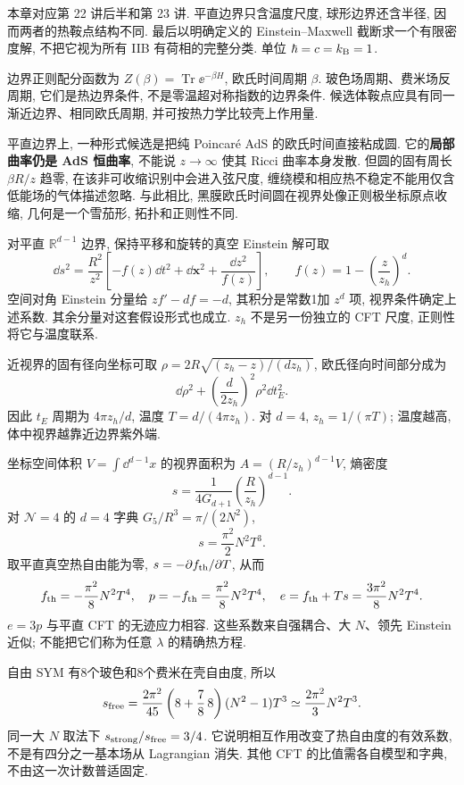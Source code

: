 本章对应第 22 讲后半和第 23 讲. 平直边界只含温度尺度, 球形边界还含半径, 因而两者的热鞍点结构不同. 最后以明确定义的 Einstein--Maxwell 截断求一个有限密度解, 不把它视为所有 IIB 有荷相的完整分类. 单位 $\hbar=c=k_{\mathrm B}=1$.

边界正则配分函数为 $Z(\beta)=\operatorname{Tr}\ee^{-\beta H}$, 欧氏时间周期 $\beta$. 玻色场周期、费米场反周期, 它们是热边界条件, 不是零温超对称指数的边界条件. 候选体鞍点应具有同一渐近边界、相同欧氏周期, 并可按热力学比较壳上作用量.

平直边界上, 一种形式候选是把纯 Poincaré AdS 的欧氏时间直接粘成圆. 它的\textbf{局部曲率仍是 AdS 恒曲率}, 不能说 $z\to\infty$ 使其 Ricci 曲率本身发散. 但圆的固有周长 $\beta R/z$ 趋零, 在该非可收缩识别中会进入弦尺度, 缠绕模和相应热不稳定不能用仅含低能场的气体描述忽略. 与此相比, 黑膜欧氏时间圆在视界处像正则极坐标原点收缩, 几何是一个雪茄形, 拓扑和正则性不同.

对平直 $\mathbb R^{d-1}$ 边界, 保持平移和旋转的真空 Einstein 解可取
\[
\dd s^2=\frac{R^2}{z^2}
\left[-f(z)\dd t^2+\dd\mathbf x^2+\frac{\dd z^2}{f(z)}\right],
\qquad f(z)=1-\left(\frac z{z_h}\right)^d.
\]
空间对角 Einstein 分量给 $zf'-df=-d$, 其积分是常数1加 $z^d$ 项, 视界条件确定上述系数. 其余分量对这套假设形式也成立. $z_h$ 不是另一份独立的 CFT 尺度, 正则性将它与温度联系.

近视界的固有径向坐标可取 $\rho=2R\sqrt{(z_h-z)/(dz_h)}$, 欧氏径向时间部分成为
\[
\dd\rho^2+\left(\frac d{2z_h}\right)^2\rho^2\dd t_E^2.
\]
因此 $t_E$ 周期为 $4\pi z_h/d$, 温度 $T=d/(4\pi z_h)$. 对 $d=4$, $z_h=1/(\pi T)$; 温度越高, 体中视界越靠近边界紫外端.

坐标空间体积 $V=\int\dd^{d-1}x$ 的视界面积为 $A=(R/z_h)^{d-1}V$, 熵密度
\[
s=\frac1{4G_{d+1}}\left(\frac R{z_h}\right)^{d-1}.
\]
对 $\mathcal N=4$ 的 $d=4$ 字典 $G_5/R^3=\pi/(2N^2)$,
\[
s=\frac{\pi^2}2N^2T^3.
\]
取平直真空热自由能为零, $s=-\partial f_{\rm th}/\partial T$, 从而
\[
f_{\rm th}=-\frac{\pi^2}8N^2T^4,
\quad p=-f_{\rm th}=\frac{\pi^2}8N^2T^4,
\quad e=f_{\rm th}+Ts=\frac{3\pi^2}8N^2T^4.
\]
$e=3p$ 与平直 CFT 的无迹应力相容. 这些系数来自强耦合、大 $N$、领先 Einstein 近似; 不能把它们称为任意 $\lambda$ 的精确热方程.

自由 SYM 有8个玻色和8个费米在壳自由度, 所以
\[
s_{\rm free}=\frac{2\pi^2}{45}
\left(8+\frac78\,8\right)(N^2-1)T^3
\simeq\frac{2\pi^2}3N^2T^3.
\]
同一大 $N$ 取法下 $s_{\rm strong}/s_{\rm free}=3/4$. 它说明相互作用改变了热自由度的有效系数, 不是有四分之一基本场从 Lagrangian 消失. 其他 CFT 的比值需各自模型和字典, 不由这一次计数普适固定.

